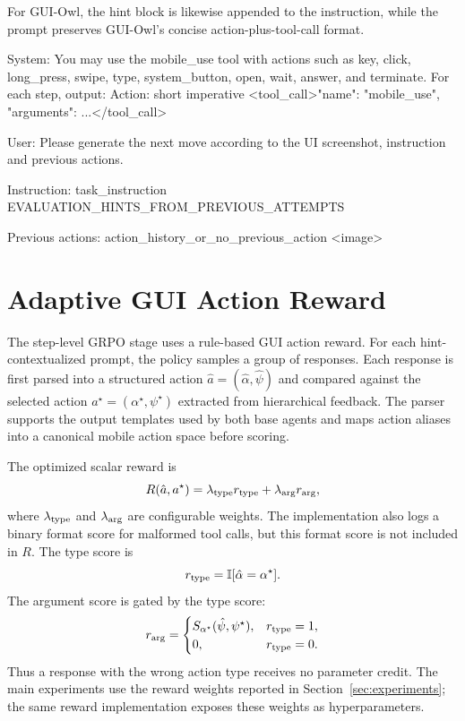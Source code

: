 \documentclass{llmxive}
\begin{document}
For GUI-Owl, the hint block is likewise appended to the instruction, while the prompt preserves GUI-Owl's concise action-plus-tool-call format.

\begin{promptlistingbox}
System:
You may use the mobile_use tool with actions such as key, click,
long_press, swipe, type, system_button, open, wait, answer, and
terminate. For each step, output:
  Action: {short imperative}
  <tool_call>{"name": "mobile_use", "arguments": {...}}</tool_call>

User:
Please generate the next move according to the UI screenshot,
instruction and previous actions.

Instruction: {task_instruction}
{EVALUATION_HINTS_FROM_PREVIOUS_ATTEMPTS}

Previous actions:
{action_history_or_no_previous_action}
<image>
\end{promptlistingbox}

\section{Adaptive GUI Action Reward}
\label{sec:appendix_reward}

The step-level GRPO stage uses a rule-based GUI action reward. For each hint-contextualized prompt, the policy samples a group of responses. Each response is first parsed into a structured action $\hat a=(\hat\alpha,\hat\psi)$ and compared against the selected action $a^\star=(\alpha^\star,\psi^\star)$ extracted from hierarchical feedback. The parser supports the output templates used by both base agents and maps action aliases into a canonical mobile action space before scoring.

The optimized scalar reward is
\begin{equation}
\label{eq:appendix_reward}
R(\hat a,a^\star)
=\lambda_{\rm type}r_{\rm type}
+\lambda_{\rm arg}r_{\rm arg},
\end{equation}
where $\lambda_{\rm type}$ and $\lambda_{\rm arg}$ are configurable weights. The implementation also logs a binary format score for malformed tool calls, but this format score is not included in $R$. The type score is
\begin{equation}
\label{eq:appendix_type_reward}
r_{\rm type}=\mathbb{I}[\hat\alpha=\alpha^\star].
\end{equation}
The argument score is gated by the type score:
\begin{equation}
\label{eq:appendix_arg_reward}
r_{\rm arg}=
\begin{cases}
S_{\alpha^\star}(\hat\psi,\psi^\star), & r_{\rm type}=1,\\
0, & r_{\rm type}=0.
\end{cases}
\end{equation}
Thus a response with the wrong action type receives no parameter credit. The main experiments use the reward weights reported in Section~\ref{sec:experiments}; the same reward implementation exposes these weights as hyperparameters.
\end{document}
